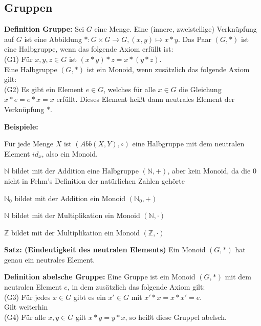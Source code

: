 \documentclass[11pt]{article}
\begin{document}
	\subsection{Gruppen}
		\begin{framed}
			\textbf{Definition Gruppe:} Sei $G$ eine Menge. Eine (innere, zweistellige) Verkn\"upfung
			auf $G$ ist eine Abbildung $*: G \times G \to G, (x,y) \mapsto x*y$. Das Paar $(G,*)$ ist eine
			Halbgruppe, wenn das folgende Axiom erf\"ullt ist: \\
			(G1) F\"ur $x,y,z \in G$ ist $(x*y)*z=x*(y*z)$. \\
			Eine Halbgruppe $(G,*)$ ist ein Monoid, wenn zus\"atzlich das folgende Axiom gilt: \\
			(G2) Es gibt ein Element $e \in G$, welches f\"ur alle $x \in G$ die Gleichung $x*e=e*x=x$
			erf\"ullt. Dieses Element hei{\ss}t dann neutrales Element der Verkn\"upfung $*$.  
		\end{framed}
		
		\textbf{Beispiele:} \\
		\begin{compactitem}
			\item F\"ur jede Menge $X$ ist $(Abb(X,Y), \circ)$ eine Halbgruppe mit dem neutralen Element
			$id_x$, also ein Monoid.
			\item $\mathbb N$ bildet mit der Addition eine Halbgruppe $(\mathbb N,+)$, aber kein Monoid,
			da die 0 nicht in Fehm's Definition der nat\"urlichen Zahlen geh\"orte
			\item $\mathbb N_0$ bildet mit der Addition ein Monoid $(\mathbb N_0,+)$
			\item $\mathbb N$ bildet mit der Multiplikation ein Monoid $(\mathbb N, \cdot)$
			\item $\mathbb Z$ bildet mit der Multiplikation ein Monoid $(\mathbb Z, \cdot)$
		\end{compactitem}
		
		\begin{framed}
			\textbf{Satz: (Eindeutigkeit des neutralen Elements)} Ein Monoid $(G,*)$ hat genau ein neutrales
			Element. 
		\end{framed}
		
		\begin{framed}
			\textbf{Definition abelsche Gruppe:} Eine Gruppe ist ein Monoid $(G,*)$ mit dem neutralen Element
			$e$, in dem zus\"atzlich das folgende Axiom gilt: \\
			(G3) F\"ur jedes $x \in G$ gibt es ein $x' \in G$ mit $x'*x=x*x'=e$. \\
			Gilt weiterhin \\
			(G4) F\"ur alle $x,y \in G$ gilt $x*y=y*x$, so hei{\ss}t diese Gruppel abelsch.
		\end{framed}
		
\end{document}
